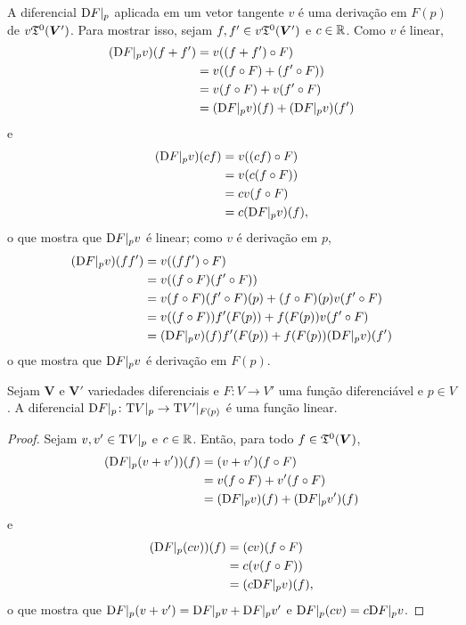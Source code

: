 A diferencial $\mathrm{D} F|_p$ aplicada em um vetor tangente $v$ é uma derivação em $F(p)$ de $v\mathfrak{T}^0(\bm V')$. Para mostrar isso, sejam $f,f' \in v\mathfrak{T}^0(\bm V')$ e $c \in \mathbb{R}$. Como $v$ é linear,
	\begin{align*}
	(\mathrm{D} F|_p v) (f+f') &= v((f + f') \circ F) \\
		&= v((f \circ F) + (f' \circ F)) \\
		&= v(f \circ F) + v(f' \circ F) \\
		&= (\mathrm{D} F|_p v) (f) + (\mathrm{D} F|_p v) (f')
	\end{align*}
e
	\begin{align*}
	(\mathrm{D} F|_p v) (cf) &= v((cf) \circ F) \\
		&= v(c(f \circ F)) \\
		&= cv(f \circ F) \\
		&= c(\mathrm{D} F|_p v) (f),
	\end{align*}
o que mostra que $\mathrm{D} F|_p v$ é linear; como $v$ é derivação em $p$,
	\begin{align*}
	(\mathrm{D} F|_p v) (ff') &= v((ff') \circ F) \\
		&= v((f \circ F)(f' \circ F)) \\
		&= v(f \circ F)(f' \circ F)(p) + (f \circ F)(p)v(f' \circ F) \\
		&= v((f \circ F))f'(F(p)) + f(F(p))v(f' \circ F) \\
		&= (\mathrm{D} F|_p v)(f)f'(F(p)) + f(F(p))(\mathrm{D} F|_p v)(f')
	\end{align*}
o que mostra que $\mathrm{D} F|_p v$ é derivação em $F(p)$.

\begin{proposition}
Sejam $\bm V$ e $\bm V'$ variedades diferenciais e $F\colon V \to V'$ uma função diferenciável e $p \in V$. A diferencial $\mathrm{D} F|_p\colon \mathrm{T} V|_p \to \mathrm{T} V'|_{F(p)}$ é uma função linear.
\end{proposition}
\begin{proof}
Sejam $v,v' \in \mathrm{T} V|_p$ e $c \in \mathbb{R}$. Então, para todo $f \in \mathfrak{T}^0(\bm V)$,
	\begin{align*}
	(\mathrm{D} F|_p (v+v')) (f) &= (v+v')(f \circ F) \\
		&= v(f \circ F) + v'(f \circ F) \\
		&= (\mathrm{D} F|_p v) (f) + (\mathrm{D} F|_p v') (f)
	\end{align*}
e
	\begin{align*}
	(\mathrm{D} F|_p (cv)) (f) &= (cv)(f \circ F) \\
		&= c(v(f \circ F)) \\
		&= (c\mathrm{D} F|_p v) (f),
	\end{align*}
o que mostra que $\mathrm{D} F|_p (v+v') = \mathrm{D} F|_p v + \mathrm{D} F|_p v'$ e $\mathrm{D} F|_p(cv) = c\mathrm{D} F|_p v$.
\end{proof}

